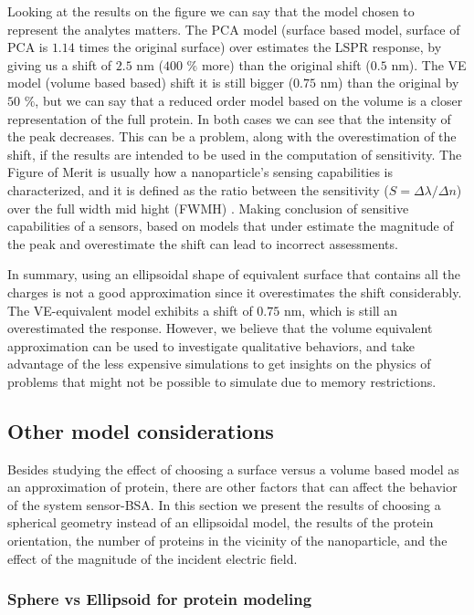 Looking at the results on the figure we can say that the model chosen to represent the analytes matters. The PCA model (surface based model, 
surface of PCA is $1.14$ times the original surface) over estimates the LSPR response, by giving us a shift of $2.5$ nm 
($400$ $\%$ more) than the original shift ($0.5$ nm). The VE model (volume based based) shift it is still bigger ($0.75$ nm) than the original 
by $50$ $\%$, but we can say that a reduced order model based on the volume is a closer representation of the full protein. In both cases we can see 
that the intensity of the peak decreases. This can be a problem, along with the overestimation of the shift,
if the results are intended to be used in the computation of sensitivity. The Figure of Merit is usually how a
nanoparticle's sensing capabilities is characterized, and it is defined as the ratio between the 
sensitivity ($S = \Delta \lambda / \Delta n$) over the full width mid hight (FWMH) \cite{otte2012}. Making 
conclusion of sensitive capabilities of a sensors, based on models that under estimate the magnitude of the peak and 
overestimate the shift can lead to incorrect assessments.

In summary, using an ellipsoidal shape of equivalent surface that contains all the charges is not a good approximation
since it overestimates the shift considerably. The VE-equivalent model exhibits a shift of $0.75$ nm, which is still  
an overestimated the response. However, we believe that the volume equivalent approximation can be used to investigate 
qualitative behaviors, and take advantage of the less expensive simulations to get insights on the physics of problems 
that might not be possible to simulate due to memory restrictions.

\subsection{Other model considerations}

Besides studying the effect of choosing a surface versus a volume based model as an approximation of protein, there are other
factors that can affect the behavior of the system sensor-BSA. In this section we present the results of choosing a spherical 
geometry instead of an ellipsoidal model, the results of the protein orientation, the number of proteins in the vicinity of the nanoparticle, and 
the effect of the magnitude of the incident electric field. 

\subsubsection{Sphere vs Ellipsoid for protein modeling}

